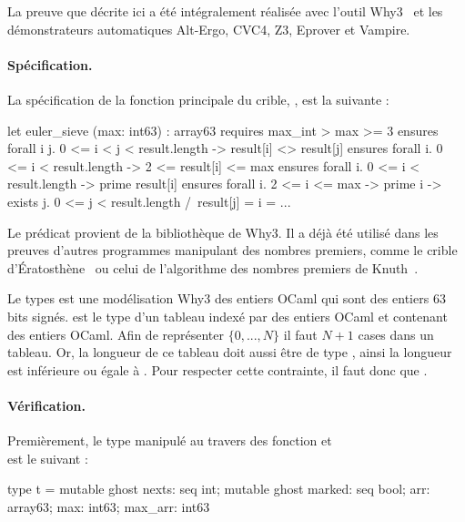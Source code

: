 \documentclass[a4paper]{easychair}
\begin{document}
La preuve que décrite ici a été intégralement réalisée avec l'outil
Why3~\cite{why3} et les démonstrateurs automatiques Alt-Ergo, CVC4, Z3, Eprover
et Vampire. %

\clearpage
\paragraph{Spécification.}
La spécification de la fonction principale du crible,
, est la suivante :

\begin{why3}
let euler_sieve (max: int63) : array63
  requires { max_int > max >= 3 }
  ensures  { forall i j. 0 <= i < j < result.length -> result[i] <> result[j] }
  ensures  { forall i. 0 <= i < result.length -> 2 <= result[i] <= max }
  ensures  { forall i. 0 <= i < result.length -> prime result[i] }
  ensures  { forall i. 2 <= i <= max -> prime i ->
                       exists j. 0 <= j < result.length /\ result[j] = i }
= ...
\end{why3}

Le prédicat  provient de la bibliothèque 
de Why3. Il a déjà été utilisé dans les preuves d'autres programmes
manipulant des nombres premiers, comme le crible
d'Ératosthène~\cite{sieve-eratosthene-why3} ou celui de l'algorithme
des nombres premiers de Knuth~\cite{knuth-prime-numbers,knuth-prime-numbers-why3}.


Le types  est une modélisation Why3 des entiers OCaml qui sont
des entiers 63 bits signés.  est le type d'un tableau indexé
par des entiers OCaml et contenant des entiers OCaml.
Afin de représenter $\{0,...,N\}$ il faut $N + 1$ cases dans un tableau.
Or, la longueur de ce tableau doit aussi être de type , ainsi
la longueur est inférieure ou égale à . Pour respecter
cette contrainte, il faut donc que .

\clearpage
\paragraph{Vérification.}

Premièrement, le type manipulé au travers des fonction 
et \\ est le suivant :
\begin{why3}
type t = {
  mutable ghost nexts: seq int;
  mutable ghost marked: seq bool;
  arr: array63;
  max: int63;
  max_arr: int63
}
\end{why3}
\end{document}
